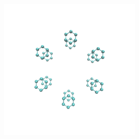 \documentclass{article}
\begin{document}
\begin{figure}[ht]
    \begin{subfigure}{0.2\textwidth}
        \centering
        \begin{subfigure}{\textwidth}
            \centering
            \includegraphics[width=\linewidth]{toplayered.png}
        \end{subfigure}%


\end{subfigure}
\end{figure}
\end{document}
